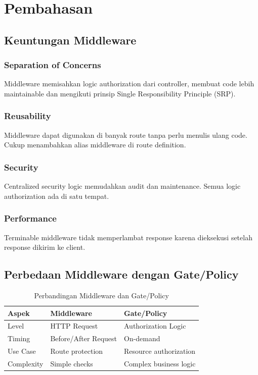 \documentclass[a4paper,oneside,11pt]{book}
\begin{document}
\section{Pembahasan}

\subsection{Keuntungan Middleware}

\subsubsection{Separation of Concerns}
Middleware memisahkan logic authorization dari controller, membuat code lebih maintainable dan mengikuti prinsip Single Responsibility Principle (SRP).

\subsubsection{Reusability}
Middleware dapat digunakan di banyak route tanpa perlu menulis ulang code. Cukup menambahkan alias middleware di route definition.

\subsubsection{Security}
Centralized security logic memudahkan audit dan maintenance. Semua logic authorization ada di satu tempat.

\subsubsection{Performance}
Terminable middleware tidak memperlambat response karena dieksekusi setelah response dikirim ke client.

\subsection{Perbedaan Middleware dengan Gate/Policy}

\begin{table}[H]
\centering
\begin{tabular}{|l|l|l|}
\hline
\textbf{Aspek} & \textbf{Middleware} & \textbf{Gate/Policy} \\
\hline
Level & HTTP Request & Authorization Logic \\
Timing & Before/After Request & On-demand \\
Use Case & Route protection & Resource authorization \\
Complexity & Simple checks & Complex business logic \\
\hline
\end{tabular}
\caption{Perbandingan Middleware dan Gate/Policy}
\end{table}
\end{document}
